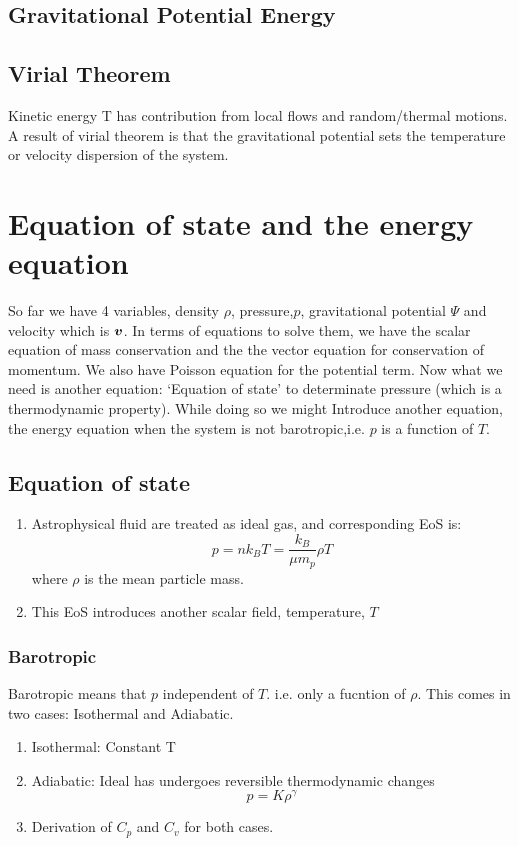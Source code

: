 \documentclass[12pt,a4paper]{article}
\begin{document}
\subsection{Gravitational Potential Energy}
\subsection{Virial Theorem}
Kinetic energy T has contribution from local flows and random/thermal motions.\\
A result of virial theorem is that the gravitational potential sets the temperature or velocity dispersion of the system.
\section{Equation of state and the energy equation}
So far we have 4 variables, density $\rho$, pressure,$p$, gravitational potential $\Psi$ and velocity which is $\vb*{v}$.
In terms of equations to solve them, we have the scalar equation of mass conservation and the the vector equation for conservation of momentum. We also have Poisson equation for the potential term.
Now what we need is another equation: `Equation of state' to determinate pressure (which is a thermodynamic property). While doing so we might Introduce another equation, the energy equation when the system is not barotropic,i.e. $p$ is a function of $T$.
\subsection{Equation of state}
    \begin{enumerate}
        \item Astrophysical fluid are treated as ideal gas, and corresponding EoS is:
        \begin{equation}
            p=nk_B T =\frac{k_B}{\mu m_p}\rho T
        \end{equation}
        where $\rho$ is the mean particle mass.
        \item This EoS introduces another scalar field, temperature, $T$
    \end{enumerate}
    \subsubsection{Barotropic}
        Barotropic means that $p$ independent of $T$. i.e. only a fucntion of $\rho$. This comes in two cases: Isothermal and Adiabatic.
        \begin{enumerate}
            \item Isothermal: Constant T
            \item Adiabatic: Ideal has undergoes reversible thermodynamic changes
            \begin{equation}
                p= K \rho^{\gamma}
            \end{equation} 
            \item Derivation of $C_p$ and $C_v$ for both cases.
        \end{enumerate}
\end{document}

